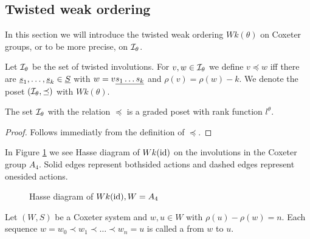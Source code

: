 \subsection{Twisted weak ordering}
\label{sec:twisted-involutions-twisted-weak-ordering}

In this section we will introduce the twisted weak ordering $Wk(\theta)$ on Coxeter groups, or to be more precise, on $\mathcal{I}_{\theta}$.

\begin{defi}
	Let $\mathcal{I}_{\theta}$ be the set of twisted involutions. For $v,w \in \mathcal{I}_{\theta}$ we define $v \preceq w$ iff there are $\underline{s}_1, \ldots, \underline{s}_k \in \underline{S}$ with $w = v \underline{ s_1 \ldots s_k }$ and $\rho(v) = \rho(w) - k$. We denote the poset $(\mathcal{I}_{\theta},\preceq)$ with $Wk(\theta)$.
\end{defi}

\begin{lemm}
	The set $\mathcal{I}_{\theta}$ with the relation $\preceq$ is a graded poset with rank function $l^\theta$.

	\begin{proof}
		Follows immediatly from the definition of $\preceq$.
	\end{proof}
\end{lemm}

\begin{exam}
	In Figure \ref{fig:a4} we see Hasse diagram of $Wk(\operatorname{id})$ on the involutions in the Coxeter group $A_4$. Solid edges represent bothsided actions and dashed edges represent onesided actions.
	\begin{figure}[ht]
		\centering
		
		\caption{Hasse diagram of $Wk(\operatorname{id}), W = A_4$}
		\label{fig:a4}
	\end{figure}
\end{exam}

\begin{defi}
	Let $(W,S)$ be a Coxeter system and $w,u \in W$ with $\rho(u) - \rho(w) = n$. Each sequence $w = w_0 \prec w_1 \prec \ldots \prec w_n = u$ is called a  from $w$ to $u$.
\end{defi}

\todo